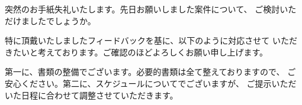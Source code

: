 \documentclass[14pt,tate]{jlreq}
\begin{document}
\makeLetterHeader

\begin{letter}

\makeOpening

\makeTransition

\par 突然のお手紙失礼いたします。先日お願いしました案件について、
 ご検討いただけましたでしょうか。

\par 特に頂戴いたしましたフィードバックを基に、以下のように対応させて
 いただきたいと考えております。ご確認のほどよろしくお願い申し上げます。

\par 第一に、書類の整備でございます。必要的書類は全て整えておりますので、
 ご安心ください。第二に、スケジュールについてでございますが、
 ご提示いただいた日程に合わせて調整させていただきます。

\makeClosingGreeting

\makeClosing

\makeSignature

\end{letter}

\end{document}
